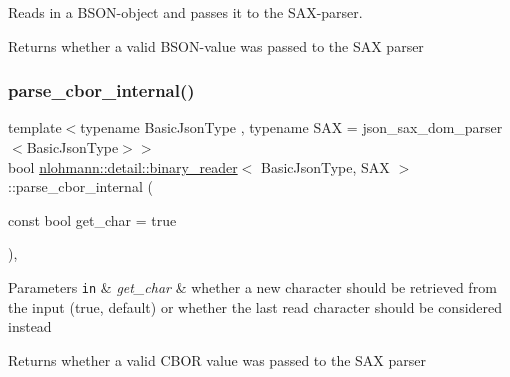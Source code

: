 Reads in a B\+S\+O\+N-\/object and passes it to the S\+A\+X-\/parser. 

\begin{DoxyReturn}{Returns}
whether a valid B\+S\+O\+N-\/value was passed to the S\+AX parser 
\end{DoxyReturn}
\mbox{\label{classnlohmann_1_1detail_1_1binary__reader_a2fc47768d484a22fcd04e20106da1399}} 
\subsubsection{\texorpdfstring{parse\+\_\+cbor\+\_\+internal()}{parse\_cbor\_internal()}}
{\footnotesize\ttfamily template$<$typename Basic\+Json\+Type , typename S\+AX  = json\+\_\+sax\+\_\+dom\+\_\+parser$<$\+Basic\+Json\+Type$>$$>$ \\
bool \mbox{\hyperlink{classnlohmann_1_1detail_1_1binary__reader}{nlohmann\+::detail\+::binary\+\_\+reader}}$<$ Basic\+Json\+Type, S\+AX $>$\+::parse\+\_\+cbor\+\_\+internal (\begin{DoxyParamCaption}\item[{const bool}]{get\+\_\+char = {\ttfamily true} }\end{DoxyParamCaption})\hspace{0.3cm}{\ttfamily [inline]}, {\ttfamily [private]}}


\begin{DoxyParams}[1]{Parameters}
\mbox{\tt in}  & {\em get\+\_\+char} & whether a new character should be retrieved from the input (true, default) or whether the last read character should be considered instead\\
\hline
\end{DoxyParams}
\begin{DoxyReturn}{Returns}
whether a valid C\+B\+OR value was passed to the S\+AX parser 
\end{DoxyReturn}
\mbox{\label{classnlohmann_1_1detail_1_1binary__reader_a81611d8a5faec1348d31f7e98fcd05ef}} 
